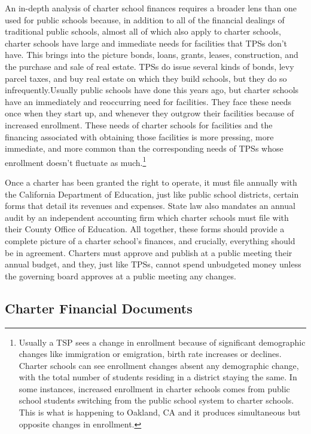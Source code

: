 An in-depth analysis of charter school finances requires a broader lens than one used for public schools because, in addition to all of the financial dealings of traditional public schools, almost all of which also apply to charter schools, charter schools have large and immediate needs for facilities that TPSs don’t have. This brings into the picture bonds, loans, grants, leases, construction, and the purchase and sale of real estate. TPSs do issue several kinds of bonds, levy parcel taxes, and buy real estate on which they build schools, but they do so infrequently.Usually public schools have done this years ago, but charter schools have an immediately and reoccurring need for facilities. They face these needs once when they start up, and whenever they outgrow their facilities because of increased enrollment. These needs of charter schools for facilities and the financing associated with obtaining those facilities is more pressing, more immediate, and more common than the corresponding needs of TPSs whose enrollment doesn't fluctuate as much.\footnote{Usually a TSP sees a change in enrollment because of significant demographic changes like immigration or emigration, birth rate increases or declines. Charter schools can see enrollment changes absent any demographic change, with the total number of students residing in a district staying the same. In some instances, increased enrollment in charter schools comes from public school students switching from the public school system to charter schools. This is what is happening to Oakland, CA and it produces simultaneous but opposite changes in enrollment.}

Once a charter has been granted the right to operate, it must file annually with the California Department of Education, just like public school districts, certain forms that detail its revenues and expenses. State law also mandates an annual audit by an independent accounting firm which charter schools must file with their County Office of Education. All together, these forms should provide a complete picture of a charter school's finances, and crucially, everything should be in agreement. Charters must approve and publish at a public meeting their annual budget, and they, just like TPSs, cannot spend unbudgeted money unless the governing board approves at a public meeting any changes.

\subsection{Charter Financial Documents}\label{sec:charter-financial-docs}\indent

